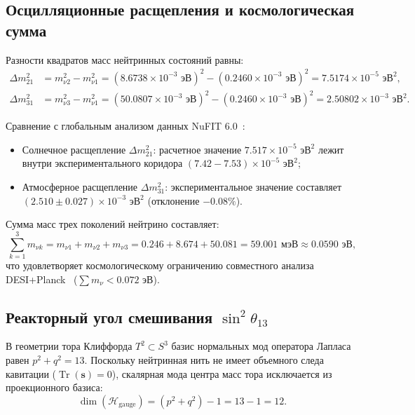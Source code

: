 \documentclass[11pt,a4paper]{article}
\theoremstyle{definition}
\theoremstyle{remark}
\begin{document}
	
\subsection{Осцилляционные расщепления и космологическая сумма}
	
Разности квадратов масс нейтринных состояний равны:
\begin{align}
	\Delta m_{21}^2 &= m_{\nu 2}^2 - m_{\nu 1}^2 = (8.6738 \times 10^{-3}\text{ эВ})^2 - (0.2460 \times 10^{-3}\text{ эВ})^2 = 7.5174 \times 10^{-5}\text{ эВ}^2, \label{eq:dm21_sq_exact} \\
	\Delta m_{31}^2 &= m_{\nu 3}^2 - m_{\nu 1}^2 = (50.0807 \times 10^{-3}\text{ эВ})^2 - (0.2460 \times 10^{-3}\text{ эВ})^2 = 2.50802 \times 10^{-3}\text{ эВ}^2. \label{eq:dm31_sq_exact}
\end{align}
	
Сравнение с глобальным анализом данных NuFIT 6.0~\cite{NuFIT60}:
\begin{itemize}
	\item Солнечное расщепление $\Delta m_{21}^2$: расчетное значение $7.517 \times 10^{-5}\text{ эВ}^2$ лежит внутри экспериментального коридора $(7.42 - 7.53) \times 10^{-5}\text{ эВ}^2$;
	\item Атмосферное расщепление $\Delta m_{31}^2$: экспериментальное значение составляет $(2.510 \pm 0.027) \times 10^{-3}\text{ эВ}^2$ (отклонение $-0.08\%$).
\end{itemize}
	
Сумма масс трех поколений нейтрино составляет:
\begin{equation}
\sum_{k=1}^3 m_{\nu k} = m_{\nu 1} + m_{\nu 2} + m_{\nu 3} = 0.246 + 8.674 + 50.081 = 59.001\text{ мэВ} \approx 0.0590\text{ эВ},
\label{eq:neutrino_sum_mass}
\end{equation}
что удовлетворяет космологическому ограничению совместного анализа DESI+Planck~\cite{DESIPlanck2024} ($\sum m_\nu < 0.072\text{ эВ}$).
	
\subsection{Реакторный угол смешивания $\sin^2\theta_{13}$}
	
В геометрии тора Клиффорда $T^2 \subset S^3$ базис нормальных мод оператора Лапласа равен $p^2 + q^2 = 13$.
Поскольку нейтринная нить не имеет объемного следа кавитации ($\operatorname{Tr}(\mathbf{s}) = 0$), скалярная мода центра масс тора исключается из проекционного базиса:
\begin{equation}
\dim(\mathcal{H}_{\mathrm{gauge}}) = (p^2 + q^2) - 1 = 13 - 1 = 12.
\label{eq:pmns_gauge_dim}
\end{equation}
	
\end{document}
